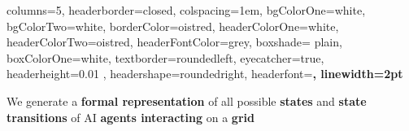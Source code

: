 \documentclass[a0paper,landscape, fontscale=0.4]{baposter}
\begin{document}
\begin{poster}{ columns=5,
headerborder=closed, %
colspacing=1em, %
bgColorOne=white, %
bgColorTwo=white, %
borderColor=oistred, %
headerColorOne=white, %
headerColorTwo=oistred, %
headerFontColor=grey, %
boxshade= plain,
boxColorOne=white, %
textborder=roundedleft, %
eyecatcher=true, %
headerheight=0.01 \textheight, %
headershape=roundedright, %
headerfont=\Large\bf\textsc, %
linewidth=2pt %
 } {} {}


\begin{posterbox}[
    name = message,  %
    column = 1, %
    span = 3, %
    boxColorOne=oistred, %
    headershade=plain,  %
    headerColorOne=oistred %
    ]{}
    \fontsize{45}{50} \selectfont  \color{white} %
    
    \vspace{2em} 
    
    \hspace{1em}
    \begin{minipage}[c][ 0.5 \textheight ]{0.6\textwidth}

        We generate a \textbf{formal representation} of all possible \textbf{states} and \textbf{state transitions} of AI \textbf{agents interacting} on a \textbf{grid}

        \vspace{2em}
        

\end{minipage}
\end{posterbox}
\end{poster}
\end{document}
